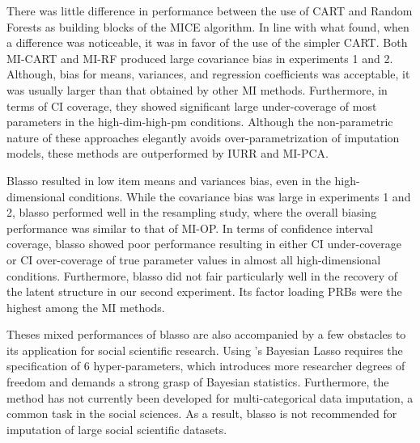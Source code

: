 	There was little difference in performance between the use of CART and Random Forests as 
	building blocks of the MICE algorithm.
	In line with what \cite{dooveEtAl:2014} found, when a difference was noticeable, it was in favor of the use 
	of the simpler CART.
	Both MI-CART and MI-RF produced large covariance bias in experiments 1 and 2.
	Although, bias for means, variances, and regression coefficients was acceptable, it was usually larger 
	than that obtained by other MI methods.
	Furthermore, in terms of CI coverage, they showed significant large under-coverage of most parameters in 
	the high-dim-high-pm conditions.
	Although the non-parametric nature of these approaches elegantly avoids over-parametrization of imputation models,
	these methods are outperformed by IURR and MI-PCA.

	Blasso resulted in low item means and variances bias, even in the high-dimensional conditions.
	While the covariance bias was large in experiments 1 and 2, blasso performed well in the resampling study, 
	where the overall biasing performance was similar to that of MI-OP.
	In terms of confidence interval coverage, blasso showed poor performance resulting in either CI 
	under-coverage or CI over-coverage of true parameter values in almost all high-dimensional conditions.
	Furthermore, blasso did not fair particularly well in the recovery of the latent structure in our second 
	experiment.
	Its factor loading PRBs were the highest among the MI methods.

	Theses mixed performances of blasso are also accompanied by a few obstacles to its application for social 
	scientific research.
	Using \cite{hans:2010}'s Bayesian Lasso requires the specification of 6 hyper-parameters, which 
	introduces more researcher degrees of freedom and demands a strong grasp of Bayesian statistics.
	Furthermore, the method has not currently been developed for multi-categorical data imputation,
	a common task in the social sciences.
	As a result, blasso is not recommended for imputation of large social scientific datasets.
